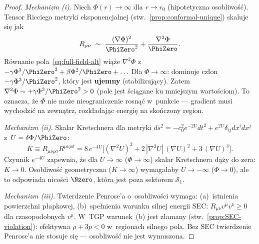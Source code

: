 \begin{proof}
\emph{Mechanizm (i).}\;
Niech $\Phi(r) \to \infty$ dla $r \to r_0$ (hipotetyczna osobliwo\'s\'c).
Tensor Ricciego metryki eksponencjalnej
(stw.~\ref{prop:conformal-unique}) skaluje si\k{e} jak
\begin{equation}\label{eq:Ricci-scaling}
  R_{\mu\nu} \;\sim\; \frac{(\nabla\Phi)^2}{\PhiZero^2}
  + \frac{\nabla^2\Phi}{\PhiZero}.
\end{equation}
R\'ownanie pola~\eqref{eq:full-field-alt} wi\k{a}\.ze $\nabla^2\Phi$
z~$-\gamma\Phi^3/\PhiZero^2 + \beta\Phi^2/\PhiZero + \ldots$
Dla $\Phi \to \infty$: dominuje cz\l{}on $-\gamma\Phi^3/\PhiZero^2$,
kt\'ory jest \textbf{ujemny} (stabilizuj\k{a}cy). Zatem
$\nabla^2\Phi \sim +\gamma\Phi^3/\PhiZero^2 > 0$
(pole jest \'sci\k{a}gane ku mniejszym warto\'sciom).
To oznacza, \.ze $\Phi$ nie mo\.ze nieograniczenie rosn\k{a}\'c
w~punkcie --- gradient musi wychodzi\'c na zewn\k{a}trz,
rozk\l{}adaj\k{a}c energi\k{e} na sko\'nczony region.

\emph{Mechanizm (ii).}\;
Skalar Kretschnera dla metryki $ds^2 = -c_0^2 e^{-2U}dt^2
+ e^{2U}\delta_{ij}dx^i dx^j$ z~$U = \delta\Phi/\PhiZero$:
\begin{equation}\label{eq:Kretschner}
  K \equiv R_{\mu\nu\rho\sigma}R^{\mu\nu\rho\sigma}
  = 8\,e^{-4U}\bigl[
    (\nabla^2 U)^2 + 2\,|\nabla^2 U|\,(\nabla U)^2
    + 3\,(\nabla U)^4
  \bigr].
\end{equation}
Czynnik $e^{-4U}$ zapewnia, \.ze dla $U \to \infty$
($\Phi \to \infty$) skalar Kretschnera d\k{a}\.zy do zera:
$K \to 0$. Osobliwo\'s\'c geometryczna ($K \to \infty$)
wymaga\l{}aby $U \to -\infty$ ($\Phi \to 0$), ale
to odpowiada nico\'sci $\Nzero$, kt\'ora jest poza
sektorem $\mathcal{S}_1$.

\emph{Mechanizm (iii).}\;
Twierdzenie Penrose'a o~osobliwo\'sci wymaga:
(a)~istnienia powierzchni p\l{}apkowej,
(b)~spe\l{}nienia warunku silnej energii SEC:
$R_{\mu\nu}v^\mu v^\nu \geq 0$ dla czasopodobnych $v^\mu$.
W~TGP warunek~(b) jest z\l{}amany
(stw.~\ref{prop:SEC-violation}): efektywna
$\rho + 3p < 0$ w~regionach silnego pola.
Bez SEC twierdzenie Penrose'a nie stosuje si\k{e}
--- osobliwo\'s\'c nie jest wymuszona.
\end{proof}

